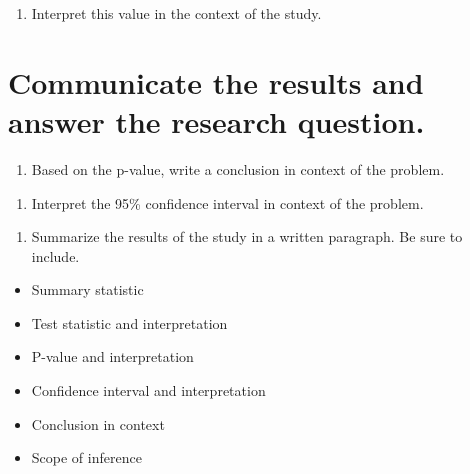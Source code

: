 \documentclass[
]{report}
\providecommand{\tightlist}{%
  \setlength{\itemsep}{0pt}\setlength{\parskip}{0pt}}
\begin{document}
\vspace{1in}

\begin{enumerate}
\def\labelenumi{\arabic{enumi}.}
\setcounter{enumi}{18}
\tightlist
\item
  Interpret this value in the context of the study.
\end{enumerate}

\vspace{1in}

\hypertarget{communicate-the-results-and-answer-the-research-question.}{%
\section{Communicate the results and answer the research question.}\label{communicate-the-results-and-answer-the-research-question.}}

\begin{enumerate}
\def\labelenumi{\arabic{enumi}.}
\setcounter{enumi}{19}
\tightlist
\item
  Based on the p-value, write a conclusion in context of the problem.
\end{enumerate}

\vspace{1in}

\begin{enumerate}
\def\labelenumi{\arabic{enumi}.}
\setcounter{enumi}{20}
\tightlist
\item
  Interpret the 95\% confidence interval in context of the problem.
\end{enumerate}

\vspace{1in}

\begin{enumerate}
\def\labelenumi{\arabic{enumi}.}
\setcounter{enumi}{21}
\tightlist
\item
  Summarize the results of the study in a written paragraph. Be sure to include.
\end{enumerate}

\begin{itemize}
\item
  Summary statistic
\item
  Test statistic and interpretation
\item
  P-value and interpretation
\item
  Confidence interval and interpretation
\item
  Conclusion in context
\item
  Scope of inference
\end{itemize}
\end{document}
